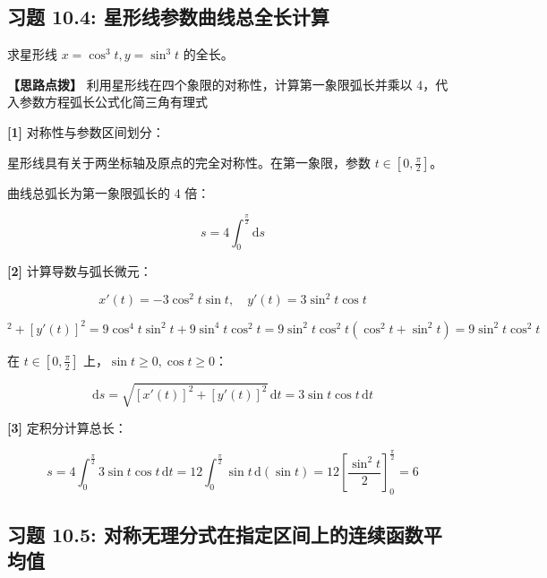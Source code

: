\documentclass[11pt,a4paper,UTF8]{ctexart}
\begin{document}
\subsection{习题 10.4: 星形线参数曲线总全长计算}

求星形线 $x = \cos^3 t, y = \sin^3 t$ 的全长。

\textbf{\color{DeepPurple}【思路点拨】} 利用星形线在四个象限的对称性，计算第一象限弧长并乘以 4，代入参数方程弧长公式化简三角有理式


\begin{solbox}[分步推导与答题规范]
\textbf{[1]} 对称性与参数区间划分：

星形线具有关于两坐标轴及原点的完全对称性。在第一象限，参数 $t \in \left[0, \frac{\pi}{2}\right]$。

曲线总弧长为第一象限弧长的 4 倍：


\begin{equation*}
s = 4 \int_0^{\frac{\pi}{2}} \mathrm{d}s
\end{equation*}


\textbf{[2]} 计算导数与弧长微元：


\begin{equation*}
x'(t) = -3\cos^2 t\sin t, \quad y'(t) = 3\sin^2 t\cos t
\end{equation*}



\begin{equation*}
[x'(t)]^2 + [y'(t)]^2 = 9\cos^4 t\sin^2 t + 9\sin^4 t\cos^2 t = 9\sin^2 t\cos^2 t(\cos^2 t + \sin^2 t) = 9\sin^2 t\cos^2 t
\end{equation*}


在 $t \in \left[0, \frac{\pi}{2}\right]$ 上，$\sin t \geqslant 0, \cos t \geqslant 0$：


\begin{equation*}
\mathrm{d}s = \sqrt{[x'(t)]^2 + [y'(t)]^2}\,\mathrm{d}t = 3\sin t\cos t\,\mathrm{d}t
\end{equation*}


\textbf{[3]} 定积分计算总长：


\begin{equation*}
s = 4 \int_0^{\frac{\pi}{2}} 3\sin t\cos t\,\mathrm{d}t = 12 \int_0^{\frac{\pi}{2}} \sin t\,\mathrm{d}(\sin t) = 12 \left[\frac{\sin^2 t}{2}\right]_0^{\frac{\pi}{2}} = 6
\end{equation*}

\end{solbox}


\subsection{习题 10.5: 对称无理分式在指定区间上的连续函数平均值}
\end{document}
